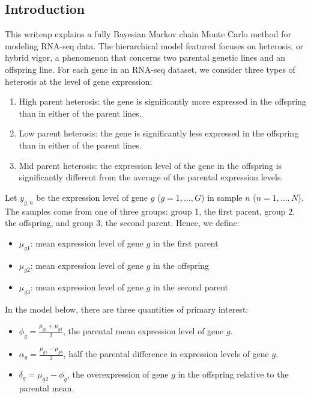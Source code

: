 \documentclass{article}\usepackage{graphicx, color}
\begin{document}
\begin{flushleft}

\section{Introduction} \label{sec:intro}

This writeup explains a fully Bayesian Markov chain Monte Carlo method for modeling RNA-seq data. The hierarchical model featured focuses on heterosis, or hybrid vigor, a phenomenon that concerns two parental genetic lines and an offspring line. For each gene in an RNA-seq dataset, we consider three types of heterosis at the level of gene expression:

\begin{enumerate}
\item High parent heterosis: the gene is significantly more expressed in the offspring than in either of the parent lines.
\item Low parent heterosis: the gene is significantly less expressed in the offspring than in either of the parent lines.
\item Mid parent heterosis: the expression level of the gene in the offspring is significantly different from the average of the parental expression levels.
\end{enumerate}

Let $y_{g,n}$ be the expression level of gene $g$  ($g = 1, \ldots, G$) in sample $n$ ($n = 1, \ldots, N$). The samples come from one of three groups: group 1, the first parent, group 2, the offspring, and group 3, the second parent. Hence, we define:

\begin{itemize}
\item $\mu_{g1}$: mean expression level of gene $g$ in the first parent
\item $\mu_{g2}$: mean expression level of gene $g$ in the offspring
\item $\mu_{g3}$: mean expression level of gene $g$ in the second parent
\end{itemize}

In the model below, there are three quantities of primary interest:

\begin{itemize}
\item $\phi_g = \frac{\mu_{g1} + \mu_{g3}}{2}$, the parental mean expression level of gene $g$.
\item $\alpha_g = \frac{\mu_{g1} - \mu_{g3}}{2}$, half the parental difference in expression levels of gene $g$.
\item $\delta_g = \mu_{g2} - \phi_g$, the overexpression of gene $g$ in the offspring relative to the parental mean.
\end{itemize}


\end{flushleft}
\end{document}
